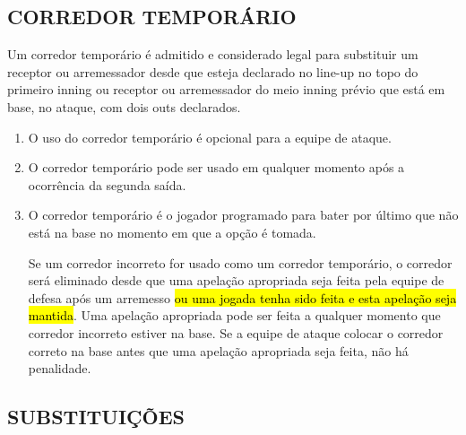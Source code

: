 \subsection{CORREDOR TEMPORÁRIO}

\begin{mdframed}[hidealllines=true,backgroundcolor=blue!20]
	Um corredor temporário é admitido e considerado legal para substituir um receptor ou arremessador desde que esteja declarado no \gls{line-up} no topo do primeiro \gls{inning} ou receptor ou arremessador do meio \gls{inning} prévio que está em base, no ataque, com dois \glspl{out} declarados.
\end{mdframed}
\begin{enumerate}[label=(\alph*)]\item   O uso do corredor temporário é opcional para a equipe de ataque.
	\item  O corredor temporário pode ser usado em qualquer momento após a ocorrência da segunda saída.
	\item  O corredor temporário é o jogador programado para bater por último que não está na base no momento em que a opção é tomada.

	Se um corredor incorreto for usado como um corredor temporário, o corredor será eliminado desde que uma apelação apropriada seja feita pela equipe de defesa após um arremesso \hl{ou uma jogada tenha sido feita e esta apela\c{c}\~ao  seja mantida}.
	Uma apelação apropriada pode ser feita a qualquer momento que corredor incorreto estiver na base. Se a equipe de ataque colocar o corredor correto na base antes que uma apelação apropriada seja feita, não há penalidade.
\end{enumerate}

\subsection{SUBSTITUIÇÕES}

